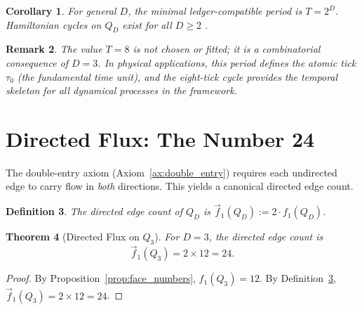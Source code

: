 \documentclass[11pt]{article}
\newtheorem{theorem}{Theorem}[section]
\newtheorem{corollary}[theorem]{Corollary}
\newtheorem{definition}[theorem]{Definition}
\newtheorem{remark}[theorem]{Remark}
\begin{document}
\begin{corollary}\label{cor:eight_general}
For general $D$, the minimal ledger-compatible period is $T = 2^D$.
Hamiltonian cycles on $Q_D$ exist for all $D \ge 2$ \cite{Savage1997Gray}.
\end{corollary}

\begin{remark}
The value $T = 8$ is not chosen or fitted; it is a combinatorial consequence of $D = 3$.
In physical applications, this period defines the \emph{atomic tick} $\tau_0$ (the fundamental time unit), and the \emph{eight-tick cycle} provides the temporal skeleton for all dynamical processes in the framework.
\end{remark}

\section{Directed Flux: The Number 24}
\label{sec:directed_flux}

The double-entry axiom (Axiom~\ref{ax:double_entry}) requires each undirected edge to carry flow in \emph{both} directions.
This yields a canonical directed edge count.

\begin{definition}\label{def:directed_edges}
The \emph{directed edge count} of $Q_D$ is $\vec{f}_1(Q_D) := 2 \cdot f_1(Q_D)$.
\end{definition}

\begin{theorem}[Directed Flux on $Q_3$]\label{thm:directed_flux}
For $D = 3$, the directed edge count is
\[
\vec{f}_1(Q_3) = 2 \times 12 = 24.
\]
\end{theorem}

\begin{proof}
By Proposition~\ref{prop:face_numbers}, $f_1(Q_3) = 12$.
By Definition~\ref{def:directed_edges}, $\vec{f}_1(Q_3) = 2 \times 12 = 24$.
\end{proof}
\end{document}
